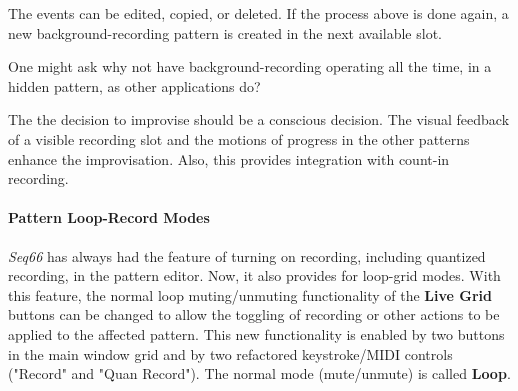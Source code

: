    The events can be edited, copied, or deleted.
   If the process above is done again, a new background-recording
   pattern is created in the next available slot.


   One might ask why not have background-recording operating all the time,
   in a hidden pattern, as other applications do?

   The the decision to improvise should be a conscious decision.
   The visual feedback of a visible recording slot and the motions of
   progress in the other patterns enhance the improvisation.
   Also, this provides integration with count-in recording.


\paragraph{Pattern Loop-Record Modes}
\label{paragraph:patterns_loop_modes}

   \textsl{Seq66} has always had the feature of turning on recording,
   including quantized recording, in the pattern editor.
   Now, it also provides for
   loop-grid modes.
   With this feature, the normal loop muting/unmuting
   functionality of the \textbf{Live Grid} buttons
   can be changed to allow the toggling
   of recording or other actions to be applied to the affected  pattern.
   This new functionality is enabled by two buttons in the main window grid and
   by two refactored keystroke/MIDI controls ("Record" and "Quan Record").
   The normal mode (mute/unmute) is called \textbf{Loop}.

